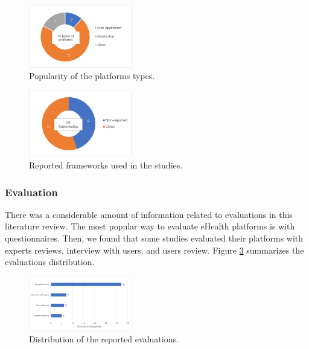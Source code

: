 \documentclass[conference]{IEEEtran}
\begin{document}
\begin{figure}[h]
    \centering
    \includegraphics[width=0.40\textwidth]{charts/platform_types.png}
    \caption{Popularity of the platforms types.}
    \label{fig:platform_types}
\end{figure}


\begin{figure}[h]
    \centering
    \includegraphics[width=0.40\textwidth]{charts/frameworks.png}
    \caption{Reported frameworks used in the studies.}
    \label{fig:frameworks}
\end{figure}

\subsubsection{Evaluation}

There was a considerable amount of information related to evaluations in this literature review. The most popular way to evaluate eHealth platforms is with questionnaires. Then, we found that some studies evaluated their platforms with experts reviews, interview with users, and users review. Figure \ref{fig:evaluations} summarizes the evaluations distribution.

\begin{figure}[h]
    \centering
    \includegraphics[width=0.40\textwidth]{charts/evaluations.png}
    \caption{Distribution of the reported evaluations.}
    \label{fig:evaluations}
\end{figure}
\end{document}
